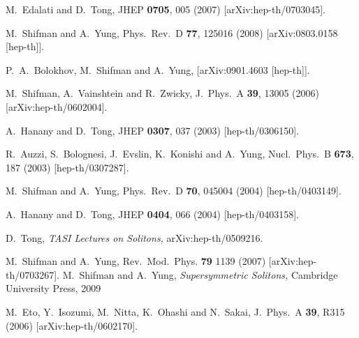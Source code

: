 \documentclass[12pt]{article}
\begin{document}
\begin{thebibliography}{99}
\itemsep -2pt



  M.~Edalati and D.~Tong,
  JHEP {\bf 0705}, 005 (2007)
  [arXiv:hep-th/0703045].

  M.~Shifman and A.~Yung,
  Phys.\ Rev.\  D {\bf 77}, 125016 (2008)
  [arXiv:0803.0158 [hep-th]].

  P.~A.~Bolokhov, M.~Shifman and A.~Yung,
  [arXiv:0901.4603 [hep-th]].
  
  M.~Shifman, A.~Vainshtein and R.~Zwicky,
  J.\ Phys.\ A  {\bf 39}, 13005 (2006)
  [arXiv:hep-th/0602004].
  
     
   

A.~Hanany and D.~Tong,
JHEP {\bf 0307}, 037 (2003)
[hep-th/0306150].

R.~Auzzi, S.~Bolognesi, J.~Evslin, K.~Konishi and A.~Yung,
Nucl.\ Phys.\ B {\bf 673}, 187 (2003)
[hep-th/0307287].

M.~Shifman and A.~Yung,
Phys.\ Rev.\ D {\bf 70}, 045004 (2004)
[hep-th/0403149].

A.~Hanany and D.~Tong,
JHEP {\bf 0404}, 066 (2004)
[hep-th/0403158].

D.~Tong,
{\em TASI Lectures on Solitons,}
  arXiv:hep-th/0509216.
  
M.~Shifman and A.~Yung,
Rev.\ Mod.\ Phys. {\bf 79} 1139 (2007)
[arXiv:hep-th/0703267].
M.~Shifman and A.~Yung,
{\sl Supersymmetric Solitons,}
Cambridge University Press, 2009
 
  M.~Eto, Y.~Isozumi, M.~Nitta, K.~Ohashi and N.~Sakai,
  J.\ Phys.\ A  {\bf 39}, R315 (2006)
  [arXiv:hep-th/0602170].
   

\end{thebibliography}
\end{document}

